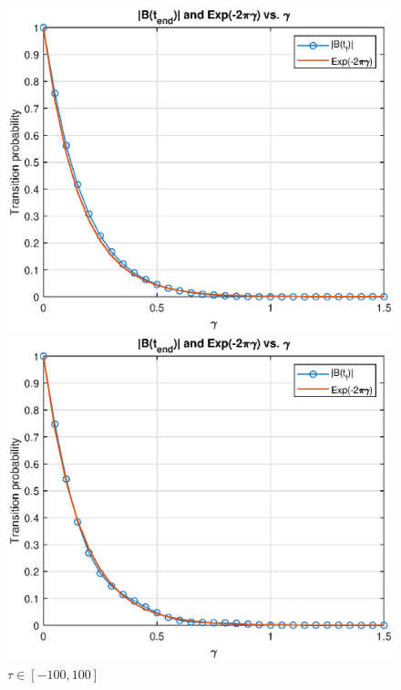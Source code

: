 \documentclass{book}
\theoremstyle{definition}
\begin{document}
\begin{figure}[!htb]
	\begin{minipage}{0.49\textwidth}
		\centering
		\includegraphics[width=\textwidth]{images/t050.eps}
		\caption{$\tau\in [-50,50]$}
		\includegraphics[width=\textwidth]{images/t100.eps}
		\caption{$\tau\in [-100,100]$}
	\end{minipage}
	\begin{minipage}{0.49\textwidth}
		\centering

\end{minipage}
\end{figure}
\end{document}

